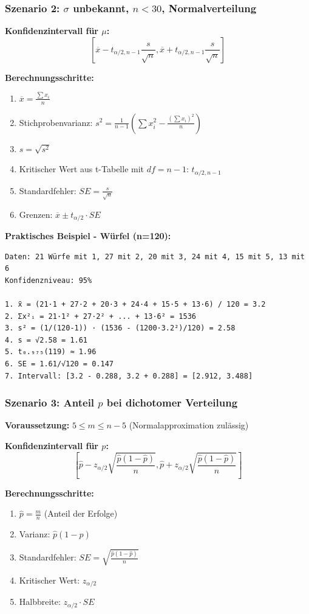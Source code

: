 \documentclass[12pt, a4paper, ngerman]{scrartcl}
\begin{document}
\subsubsection{Szenario 2: $\sigma$ unbekannt, $n < 30$, Normalverteilung}

\textbf{Konfidenzintervall für $\mu$:}
$$\left[\overline{x} - t_{\alpha/2, n-1} \frac{s}{\sqrt{n}}, \overline{x} + t_{\alpha/2, n-1} \frac{s}{\sqrt{n}}\right]$$

\textbf{Berechnungsschritte:}
\begin{enumerate}
  \item $\overline{x} = \frac{\sum x_i}{n}$
  \item Stichprobenvarianz: $s^2 = \frac{1}{n-1}\left(\sum x_i^2 - \frac{(\sum x_i)^2}{n}\right)$
  \item $s = \sqrt{s^2}$
  \item Kritischer Wert aus t-Tabelle mit $df = n-1$: $t_{\alpha/2, n-1}$
  \item Standardfehler: $SE = \frac{s}{\sqrt{n}}$
  \item Grenzen: $\overline{x} \pm t_{\alpha/2} \cdot SE$
\end{enumerate}

\textbf{Praktisches Beispiel - Würfel (n=120):}
\begin{verbatim}
Daten: 21 Würfe mit 1, 27 mit 2, 20 mit 3, 24 mit 4, 15 mit 5, 13 mit 6
Konfidenzniveau: 95%

1. x̄ = (21·1 + 27·2 + 20·3 + 24·4 + 15·5 + 13·6) / 120 = 3.2
2. Σx²ᵢ = 21·1² + 27·2² + ... + 13·6² = 1536
3. s² = (1/(120-1)) · (1536 - (1200·3.2²)/120) = 2.58
4. s = √2.58 = 1.61
5. t₀.₉₇₅(119) ≈ 1.96
6. SE = 1.61/√120 = 0.147
7. Intervall: [3.2 - 0.288, 3.2 + 0.288] = [2.912, 3.488]
\end{verbatim}

\subsubsection{Szenario 3: Anteil $p$ bei dichotomer Verteilung}

\textbf{Voraussetzung:} $5 \leq m \leq n-5$ (Normalapproximation zulässig)

\textbf{Konfidenzintervall für $p$:}
$$\left[\hat{p} - z_{\alpha/2}\sqrt{\frac{\hat{p}(1-\hat{p})}{n}}, \hat{p} + z_{\alpha/2}\sqrt{\frac{\hat{p}(1-\hat{p})}{n}}\right]$$

\textbf{Berechnungsschritte:}
\begin{enumerate}
  \item $\hat{p} = \frac{m}{n}$ (Anteil der Erfolge)
  \item Varianz: $\hat{p}(1-\hat{p})$
  \item Standardfehler: $SE = \sqrt{\frac{\hat{p}(1-\hat{p})}{n}}$
  \item Kritischer Wert: $z_{\alpha/2}$
  \item Halbbreite: $z_{\alpha/2} \cdot SE$
\end{enumerate}
\end{document}
